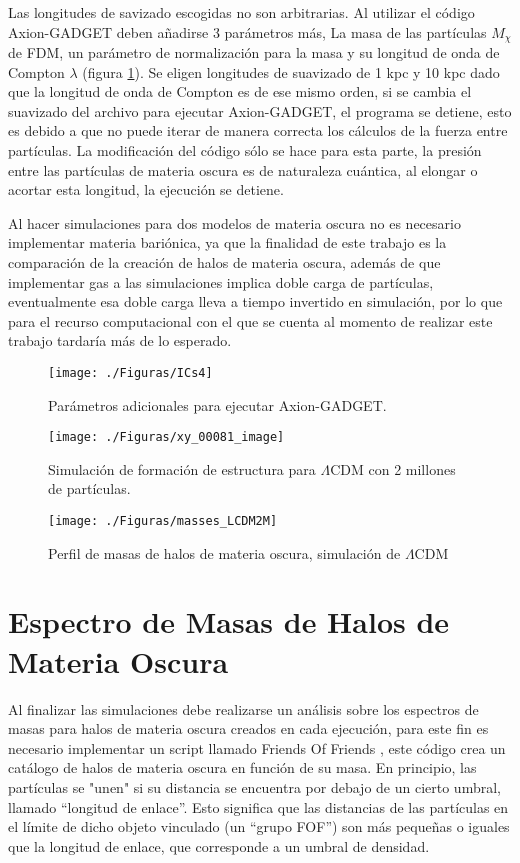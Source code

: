 \documentclass[a4paper,openright,12pt]{book}
\begin{document}
Las longitudes de savizado escogidas no son arbitrarias. Al utilizar el código Axion-GADGET deben añadirse 3 parámetros más, La masa de las partículas $M_{\chi}$ de FDM, un parámetro de normalización para la masa y su longitud de onda de Compton $\lambda$ (figura \ref{fig 4.2}). Se eligen longitudes de suavizado de 1 kpc y 10 kpc dado que la longitud de onda de Compton es de ese mismo orden, si se cambia el suavizado del archivo para ejecutar Axion-GADGET, el programa se detiene, esto es debido a que no puede iterar de manera correcta los cálculos de la fuerza entre partículas. La modificación del código sólo se hace para esta parte, la presión entre las partículas de materia oscura es de naturaleza cuántica, al elongar o acortar esta longitud, la ejecución se detiene.

Al hacer simulaciones para dos modelos de materia oscura no es necesario implementar materia bariónica, ya que la finalidad de este trabajo es la comparación de la creación de halos de materia oscura, además de que implementar gas a las simulaciones implica doble carga de partículas, eventualmente esa doble carga lleva a tiempo invertido en simulación, por lo que para el recurso computacional con el que se cuenta al momento de realizar este trabajo tardaría más de lo esperado.

\begin{figure}
\centering \texttt{[image: ./Figuras/ICs4]}
\caption{\footnotesize{Parámetros adicionales para ejecutar Axion-GADGET.}}
\label{fig 4.2}
\end{figure}

\begin{figure}[htpb]
\centering
\texttt{[image: ./Figuras/xy\_00081\_image]}
\caption{\footnotesize{Simulación de formación de estructura para $\Lambda$CDM con 2 millones de part\'iculas.}} \label{fig 4.3}
\end{figure}

\begin{figure}
\centering
\texttt{[image: ./Figuras/masses\_LCDM2M]}
\caption{\footnotesize{Perfil de masas de halos de materia oscura, simulaci\'on de $\Lambda$CDM}}\label{fig 4.3.1}
\end{figure}

\section{Espectro de Masas de Halos de Materia Oscura}
Al finalizar las simulaciones debe realizarse un análisis sobre los espectros de masas para halos de materia oscura creados en cada ejecución, para este fin es necesario implementar un script llamado Friends Of Friends \cite{4.4}, este código crea un catálogo de halos de materia oscura en función de su masa. En principio, las partículas se "unen" si su distancia se encuentra por debajo de un cierto umbral, llamado ``longitud de enlace''. Esto significa que las distancias de las partículas en el límite de dicho objeto vinculado (un ``grupo FOF'') son más pequeñas o iguales que la longitud de enlace, que corresponde a un umbral de densidad. 
\end{document}
